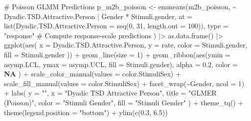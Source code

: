 \documentclass[
  bookmarksnumbered]{article}
\newenvironment{Shaded}{\begin{snugshade}}{\end{snugshade}}
\newcommand{\AttributeTok}[1]{\textcolor[rgb]{0.80,0.80,0.80}{#1}}
\newcommand{\CommentTok}[1]{\textcolor[rgb]{0.50,0.62,0.50}{#1}}
\newcommand{\ConstantTok}[1]{\textcolor[rgb]{0.86,0.64,0.64}{\textbf{#1}}}
\newcommand{\DecValTok}[1]{\textcolor[rgb]{0.86,0.86,0.80}{#1}}
\newcommand{\FloatTok}[1]{\textcolor[rgb]{0.75,0.75,0.82}{#1}}
\newcommand{\FunctionTok}[1]{\textcolor[rgb]{0.94,0.94,0.56}{#1}}
\newcommand{\NormalTok}[1]{\textcolor[rgb]{0.80,0.80,0.80}{#1}}
\newcommand{\OtherTok}[1]{\textcolor[rgb]{0.94,0.94,0.56}{#1}}
\newcommand{\SpecialCharTok}[1]{\textcolor[rgb]{0.86,0.64,0.64}{#1}}
\newcommand{\StringTok}[1]{\textcolor[rgb]{0.80,0.58,0.58}{#1}}
\begin{document}
\begin{Shaded}
\begin{Highlighting}[]
\CommentTok{\# Poisson GLMM Predictions}
\NormalTok{p\_m2b\_poisson }\OtherTok{\textless{}{-}} \FunctionTok{emmeans}\NormalTok{(m2b\_poisson, }\SpecialCharTok{\textasciitilde{}}\NormalTok{ Dyadic.TSD.Attractive.Person }\SpecialCharTok{|}\NormalTok{ Gender }\SpecialCharTok{*}\NormalTok{ Stimuli.gender,}
  \AttributeTok{at =} \FunctionTok{list}\NormalTok{(}\AttributeTok{Dyadic.TSD.Attractive.Person =} \FunctionTok{seq}\NormalTok{(}\DecValTok{0}\NormalTok{, }\DecValTok{31}\NormalTok{, }\AttributeTok{length.out =} \DecValTok{100}\NormalTok{)),}
  \AttributeTok{type =} \StringTok{"response"} \CommentTok{\# Compute response{-}scale predictions}
\NormalTok{) }\SpecialCharTok{|\textgreater{}}
  \FunctionTok{as.data.frame}\NormalTok{() }\SpecialCharTok{|\textgreater{}}
  \FunctionTok{ggplot}\NormalTok{(}\FunctionTok{aes}\NormalTok{(}
    \AttributeTok{x =}\NormalTok{ Dyadic.TSD.Attractive.Person, }\AttributeTok{y =}\NormalTok{ rate,}
    \AttributeTok{color =}\NormalTok{ Stimuli.gender, }\AttributeTok{fill =}\NormalTok{ Stimuli.gender}
\NormalTok{  )) }\SpecialCharTok{+}
  \FunctionTok{geom\_line}\NormalTok{(}\AttributeTok{size =} \DecValTok{1}\NormalTok{) }\SpecialCharTok{+}
  \FunctionTok{geom\_ribbon}\NormalTok{(}\FunctionTok{aes}\NormalTok{(}\AttributeTok{ymin =}\NormalTok{ asymp.LCL, }\AttributeTok{ymax =}\NormalTok{ asymp.UCL, }\AttributeTok{fill =}\NormalTok{ Stimuli.gender),}
    \AttributeTok{alpha =} \FloatTok{0.2}\NormalTok{, }\AttributeTok{color =} \ConstantTok{NA}
\NormalTok{  ) }\SpecialCharTok{+}
  \FunctionTok{scale\_color\_manual}\NormalTok{(}\AttributeTok{values =}\NormalTok{ color.StimuliSex) }\SpecialCharTok{+}
  \FunctionTok{scale\_fill\_manual}\NormalTok{(}\AttributeTok{values =}\NormalTok{ color.StimuliSex) }\SpecialCharTok{+}
  \FunctionTok{facet\_wrap}\NormalTok{(}\SpecialCharTok{\textasciitilde{}}\NormalTok{Gender, }\AttributeTok{ncol =} \DecValTok{1}\NormalTok{) }\SpecialCharTok{+}
  \FunctionTok{labs}\NormalTok{(}
    \AttributeTok{y =} \StringTok{""}\NormalTok{, }\AttributeTok{x =} \StringTok{"Dyadic TSD Attractive Person"}\NormalTok{,}
    \AttributeTok{title =} \StringTok{"GLMER (Poisson)"}\NormalTok{, }\AttributeTok{color =} \StringTok{"Stimuli Gender"}\NormalTok{, }\AttributeTok{fill =} \StringTok{"Stimuli Gender"}
\NormalTok{  ) }\SpecialCharTok{+}
  \FunctionTok{theme\_tq}\NormalTok{() }\SpecialCharTok{+}
  \FunctionTok{theme}\NormalTok{(}\AttributeTok{legend.position =} \StringTok{"bottom"}\NormalTok{) }\SpecialCharTok{+}
  \FunctionTok{ylim}\NormalTok{(}\FunctionTok{c}\NormalTok{(}\FloatTok{0.3}\NormalTok{, }\FloatTok{6.5}\NormalTok{))}


\end{Highlighting}
\end{Shaded}
\end{document}
